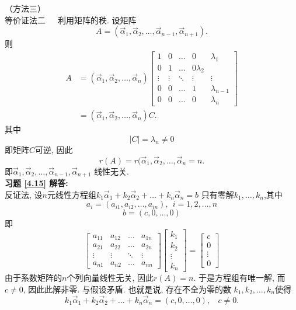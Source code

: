 （方法三）\\
等价证法二\ \ \ 利用矩阵的秩. 设矩阵$$A=(\vec{\alpha}_1,\vec{\alpha}_2,\dots,\vec{\alpha}_{n-1},\vec{\alpha}_{n+1}).$$ 则
\begin{displaymath}\begin{aligned}A&=(\vec{\alpha}_1,\vec{\alpha}_2,\dots,\vec{\alpha}_n)\begin{bmatrix}1&0&\dots&0&\lambda_1\\0&1&\dots&0\lambda_2\\
\vdots&\vdots&\ddots&\vdots&\vdots\\0&0&\dots&1&
\lambda_{n-1} \\0&0&\dots&0&\lambda_n\end{bmatrix}\\&=(\vec{\alpha}_1,\vec{\alpha}_2,\dots,\vec{\alpha}_n)C.\end{aligned}\end{displaymath}
其中$$|C|=\lambda_n\not=0$$即矩阵$C$可逆, 因此$$r(A)=r(\vec{\alpha}_1,\vec{\alpha}_2,\dots,\vec{\alpha}_n=n.$$
即$\vec{\alpha}_1,\vec{\alpha}_2,\dots,\vec{\alpha}_{n-1},\vec{\alpha}_{n+1}$ 线性无关.\\
\textbf{习题 \ref{4.15} 解答:}\\
反证法, 设$n$元线性方程组$k_1\vec{\alpha}_1+k_2\vec{\alpha}_2+\dots+k_n\vec{\alpha}_n=b$ 只有零解$k_1,\dots,k_n$,其中
$$a_i=(a_{i1},a_{i2},\dots,a_{in}),\ \ i=1,2,\dots,n$$
$$b=(c,0,\dots,0)$$
即
\begin{displaymath}\begin{bmatrix}a_{11}&a_{12}&\dots &a_{1n}\\a_{21}&a_{22}&\dots&a_{2n}\\ \vdots&\vdots&\ddots&\vdots\\ a_{n1}&a_{n2}&\dots&a_{nn}\end{bmatrix}
\begin{bmatrix}k_1\\k_2\\ \vdots\\ k_n\end{bmatrix}=\begin{bmatrix}c\\0\\ \vdots \\ 0\end{bmatrix}\end{displaymath}
由于系数矩阵的$n$个列向量线性无关, 因此$r(A)=n$. 于是方程组有唯一解, 而$c\not=0$, 因此此解非零. 与假设矛盾. 也就是说, 存在不全为零的数
$k_1,k_2,\dots,k_n$使得$$k_1\vec{\alpha}_1+k_2\vec{\alpha}_2+\dots+k_n\vec{\alpha}_n=(c,0,\dots,0),\ \ \ \ c\not=0.$$
